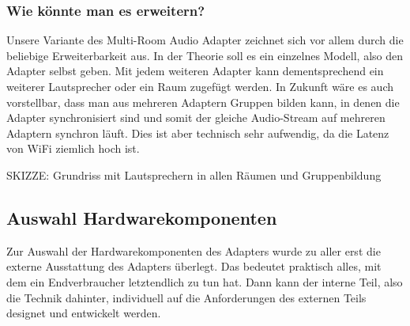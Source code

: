 \documentclass[11pt, twoside]{article}
\begin{document}
\subsubsection{Wie könnte man es erweitern?}
Unsere Variante des Multi-Room Audio Adapter zeichnet sich vor allem durch die beliebige Erweiterbarkeit aus. In der Theorie soll es ein einzelnes Modell, also den Adapter selbst geben. Mit jedem weiteren Adapter kann dementsprechend ein weiterer Lautsprecher oder ein Raum zugefügt werden. In Zukunft wäre es auch vorstellbar, dass man aus mehreren Adaptern Gruppen bilden kann, in denen die Adapter synchronisiert sind und somit der gleiche Audio-Stream auf mehreren Adaptern synchron läuft. Dies ist aber technisch sehr aufwendig, da die Latenz von WiFi ziemlich hoch ist.\newline

SKIZZE: Grundriss mit Lautsprechern in allen Räumen und Gruppenbildung
\subsection{Auswahl Hardwarekomponenten}
Zur Auswahl der Hardwarekomponenten des Adapters wurde zu aller erst die externe Ausstattung des Adapters überlegt. Das bedeutet praktisch alles, mit dem ein Endverbraucher letztendlich zu tun hat. Dann kann der interne Teil, also die Technik dahinter, individuell auf die Anforderungen des externen Teils designet und entwickelt werden.
\end{document}
